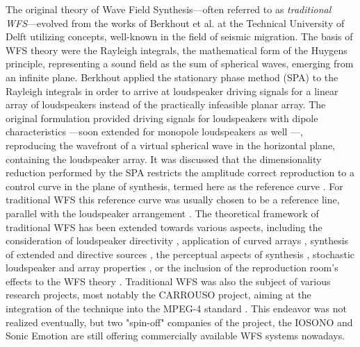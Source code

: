 The original theory of Wave Field Synthesis---often referred to as \emph{traditional WFS}---evolved from the works of Berkhout et al. at the Technical University of Delft utilizing concepts, well-known in the field of seismic migration.%
The basis of WFS theory were the Rayleigh integrals, the mathematical form of the Huygens principle, representing a sound field as the sum of spherical waves, emerging from an infinite plane.
Berkhout applied the stationary phase method (SPA) to the Rayleigh integrals in order to arrive at loudspeaker driving signals for a linear array of loudspeakers instead of the practically infeasible planar array.
The original formulation provided driving signals for loudspeakers with dipole characteristics \cite{Berkhout1988, Berkhout1993:Acoustic_control_by_WFS}---soon extended for monopole loudspeakers as well \cite{doi:10.1121/1.404755, Vogel1993:phd, devries1994the, Start1997:phd, Verheijen1997:phd, deBrujin2004}---, reproducing the wavefront of a virtual spherical wave in the horizontal plane, containing the loudspeaker array.
It was discussed that the dimensionality reduction performed by the SPA restricts the amplitude correct reproduction to a control curve in the plane of synthesis, termed here as the reference curve \cite{sonke1998variable}.
For traditional WFS this reference curve was usually chosen to be a reference line, parallel with the loudspeaker arrangement \cite{start1996application, Start1997:phd}.
The theoretical framework of traditional WFS has been extended towards various aspects, including the consideration of loudspeaker directivity \cite{devries1996sound, Firtha2012:isma}, application of curved arrays \cite{start1996application}, synthesis of extended and directive sources \cite{Corteel2007, Baalman2008:phd}, the perceptual aspects of synthesis \cite{Hulsebos2004:phd, wittek2004spatial, strauss2004generation, Corteel2006:phd, Wittek2007:phd}, stochastic loudspeaker and array properties \cite{Firtha2013:daga, Firtha2013:internoise}, or the inclusion of the reproduction room's effects to the WFS theory \cite{spors2003an, corteel2003listening, 1326755, buchner2004efficient, petrausch2005simulation}.
Traditional WFS was also the subject of various research projects, most notably the CARROUSO project, aiming at the integration of the technique into the MPEG-4 standard \cite{sporer2001carrouso}. 
This endeavor was not realized eventually, but two "spin-off" companies of the project, the IOSONO and Sonic Emotion are still offering commercially available WFS systems nowadays.

